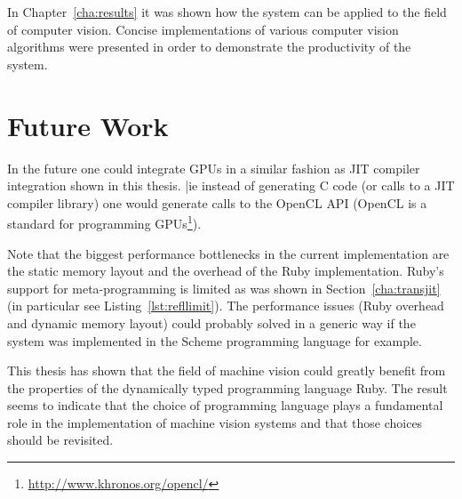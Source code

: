 \documentclass[12pt,a4paper,oneside,openright]{book}
\newcommand{\cha}[1]{Chapter~\ref{cha:#1}}
\newcommand{\sct}[1]{Section~\ref{cha:#1}}
\newcommand{\lst}[1]{Listing~\ref{lst:#1}}
\begin{document}
\begin{CJK}{UTF8}{}
In \cha{results} it was shown how the system can be applied to the field of computer vision. Concise implementations of various computer vision algorithms were presented in order to demonstrate the productivity of the system.

\section{Future Work}
In the future one could integrate \acp{GPU} in a similar fashion as \ac{JIT} compiler integration shown in this thesis. |ie instead of generating C code (or calls to a \ac{JIT} compiler library) one would generate calls to the OpenCL \ac{API} (OpenCL is a standard for programming \acp{GPU}\footnote{\url{http://www.khronos.org/opencl/}}).

Note that the biggest performance bottlenecks in the current implementation are the static memory layout and the overhead of the Ruby implementation. Ruby's support for meta-programming is limited as was shown in \sct{transjit} (in particular see \lst{refllimit}). The performance issues (Ruby overhead and dynamic memory layout) could probably solved in a generic way if the system was implemented in the Scheme programming language for example.

This thesis has shown that the field of machine vision could greatly benefit from the properties of the dynamically typed programming language Ruby. The result seems to indicate that the choice of programming language plays a fundamental role in the implementation of machine vision systems and that those choices should be revisited.





\end{CJK}
\end{document}
